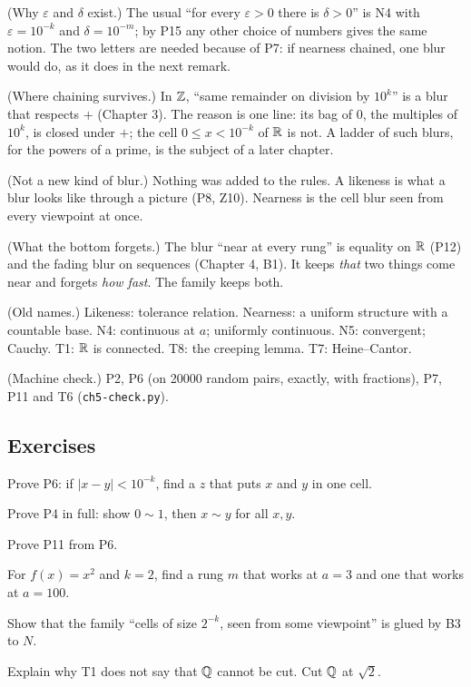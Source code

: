 \begin{lines}
\item[\lab{R1}] (Why $\varepsilon$ and $\delta$ exist.) The usual ``for every $\varepsilon > 0$ there is $\delta > 0$'' is N4 with $\varepsilon = 10^{-k}$ and $\delta = 10^{-m}$; by P15 any other choice of numbers gives the same notion. The two letters are needed because of P7: if nearness chained, one blur would do, as it does in the next remark.
\item[\lab{R2}] (Where chaining survives.) In $\mathbb{Z}$, ``same remainder on division by $10^k$'' is a blur that respects $+$ (Chapter 3). The reason is one line: its bag of $0$, the multiples of $10^k$, is closed under $+$; the cell $0 \le x < 10^{-k}$ of $\mathbb{R}$ is not. A ladder of such blurs, for the powers of a prime, is the subject of a later chapter.
\item[\lab{R3}] (Not a new kind of blur.) Nothing was added to the rules. A likeness is what a blur looks like through a picture (P8, Z10). Nearness is the cell blur seen from every viewpoint at once.
\item[\lab{R4}] (What the bottom forgets.) The blur ``near at every rung'' is equality on $\mathbb{R}$ (P12) and the fading blur on sequences (Chapter 4, B1). It keeps \emph{that} two things come near and forgets \emph{how fast}. The family keeps both.
\item[\lab{R5}] (Old names.) Likeness: tolerance relation. Nearness: a uniform structure with a countable base. N4: continuous at $a$; uniformly continuous. N5: convergent; Cauchy. T1: $\mathbb{R}$ is connected. T8: the creeping lemma. T7: Heine--Cantor.
\item[\lab{R6}] (Machine check.) P2, P6 (on 20000 random pairs, exactly, with fractions), P7, P11 and T6 (\texttt{ch5-check.py}).
\end{lines}

\subsection*{Exercises}

\begin{lines}
\item[\lab{E1}] Prove P6: if $|x - y| < 10^{-k}$, find a $z$ that puts $x$ and $y$ in one cell.
\item[\lab{E2}] Prove P4 in full: show $0 \sim 1$, then $x \sim y$ for all $x, y$.
\item[\lab{E3}] Prove P11 from P6.
\item[\lab{E4}] For $f(x) = x^2$ and $k = 2$, find a rung $m$ that works at $a = 3$ and one that works at $a = 100$.
\item[\lab{E5}] Show that the family ``cells of size $2^{-k}$, seen from some viewpoint'' is glued by B3 to $N$.
\item[\lab{E6}] Explain why T1 does not say that $\mathbb{Q}$ cannot be cut. Cut $\mathbb{Q}$ at $\sqrt2$.
\end{lines}

